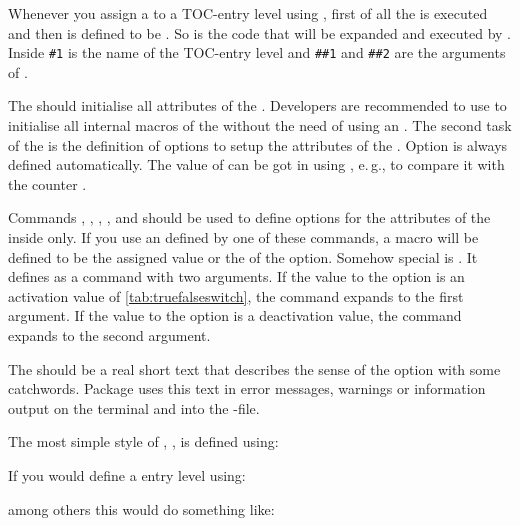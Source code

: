Whenever you assign a  to a TOC-entry level using
, first of all the  is executed and then  is defined to be
. So  is the code that will be
expanded and executed by . Inside  \texttt{\#1} is the name of the TOC-entry level and \texttt{\#\#1} and
\texttt{\#\#2} are the arguments of .

The  should initialise all attributes of the
. Developers are recommended to use  to
initialise all internal macros of the  without the need of
using an . The second task of the  is
the definition of options to setup the attributes of the . Option
 is always defined automatically. The value of 
can be got in  using
%
, e.\,g., to compare it with
the counter .

Commands ,
, ,
, and 
should be used to define options for the attributes of the
 inside  only. If you use an 
defined by one of these commands, a macro  will be defined to be the assigned value or the
 of the option. Somehow special is
. It defines  as a command with two arguments. If the value to
the option is an activation value of \autoref{tab:truefalseswitch},
 the command expands to the first
argument. If the value to the option is a deactivation value, the command
expands to the second argument.

The  should be a real short text that describes the sense
of the option with some catchwords. Package  uses this text
in error messages, warnings or information output on the terminal and into the
-file.

The most simple style of , , is defined
using:
\begin{lstcode}
\end{lstcode}
If you would define a entry level  using:
\begin{lstcode}
\end{lstcode}
among others this would do something like:
\begin{lstcode}
  \def\dummytocdepth{1}
  \def\l@dummy#1#2{}
\end{lstcode}

